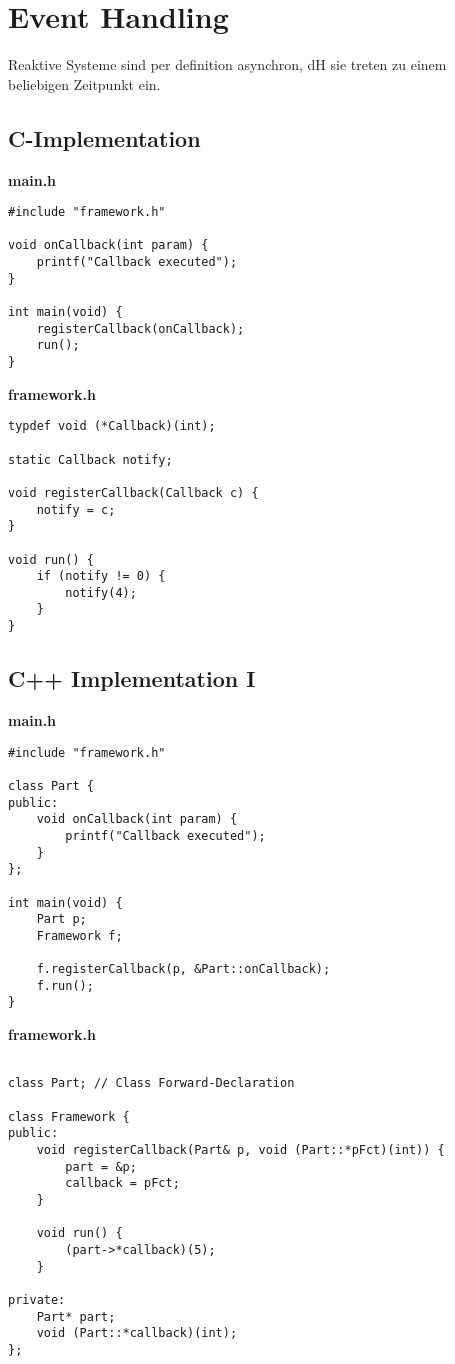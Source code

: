 \section{Event Handling}
Reaktive Systeme sind per definition asynchron, dH sie treten zu einem beliebigen Zeitpunkt ein.

\subsection{C-Implementation}
\textbf{main.h}
\begin{lstlisting}
#include "framework.h"
	
void onCallback(int param) {
	printf("Callback executed");
}
	
int main(void) {
	registerCallback(onCallback);
	run();
}
\end{lstlisting}

\textbf{framework.h}
\begin{lstlisting}
typdef void (*Callback)(int);

static Callback notify;

void registerCallback(Callback c) {
	notify = c;
}

void run() {
	if (notify != 0) {
		notify(4);
	}
}
\end{lstlisting}

\subsection{C++ Implementation I}
\textbf{main.h}
\begin{lstlisting}
#include "framework.h"

class Part {
public: 
	void onCallback(int param) {
		printf("Callback executed");
	}
};

int main(void) {
	Part p;
	Framework f;
	
	f.registerCallback(p, &Part::onCallback);
	f.run();
}
\end{lstlisting}

\textbf{framework.h}
\begin{lstlisting}

class Part; // Class Forward-Declaration

class Framework {
public:
	void registerCallback(Part& p, void (Part::*pFct)(int)) {
		part = &p;
		callback = pFct;
	}
	
	void run() {
		(part->*callback)(5);
	}

private:
	Part* part;
	void (Part::*callback)(int);
};
\end{lstlisting}

